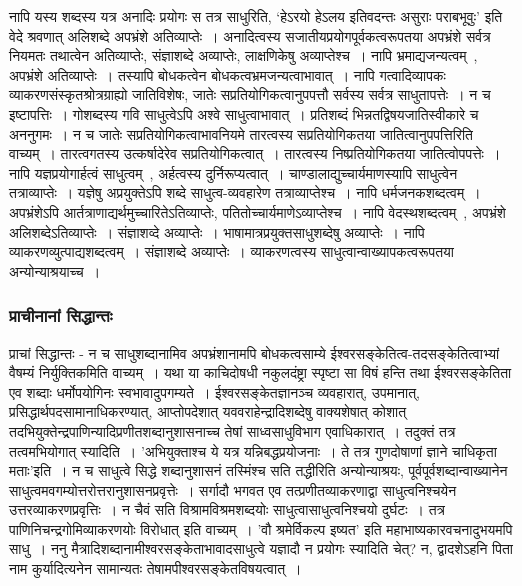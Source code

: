 				नापि यस्य शब्दस्य यत्र अनादिः प्रयोगः स तत्र साधुरिति, ‘हेऽरयो हेऽलय इतिवदन्तः असुराः पराबभूवुः’ इति वेदे श्रवणात्  अलिशब्दे अपभ्रंशे अतिव्याप्तेः~। अनादित्वस्य सजातीयप्रयोगपूर्वकत्वरूपतया अपभ्रंशे सर्वत्र नियमतः तथात्वेन अतिव्याप्तेः, संज्ञाशब्दे अव्याप्तेः, लाक्षणिकेषु अव्याप्तेश्च~। नापि भ्रमाद्यजन्यत्वम्~, अपभ्रंशे अतिव्याप्तेः~। तस्यापि बोधकत्वेन बोधकत्वभ्रमजन्यत्वाभावात्~। नापि गत्वादिव्यापकः व्याकरणसंस्कृतश्रोत्रग्राह्यो जातिविशेषः, जातेः सप्रतियोगिकत्वानुपपत्तौ सर्वस्य सर्वत्र साधुतापत्तेः~। न च इष्टापत्तिः~। गोशब्दस्य गवि साधुत्वेऽपि अश्वे साधुत्वाभावात्~। प्रतिशब्दं भिन्नतद्विषयजातिस्वीकारे च अननुगमः~। न च जातेः सप्रतियोगिकत्वाभावनियमे तारत्वस्य सप्रतियोगिकतया जातित्वानुपपत्तिरिति वाच्यम्~। तारत्वगतस्य उत्कर्षादेरेव सप्रतियोगिकत्वात्~। तारत्वस्य निष्प्रतियोगिकतया जातित्वोपपत्तेः~। नापि यज्ञप्रयोगार्हत्वं साधुत्वम्~, अर्हत्वस्य दुर्निरूप्यत्वात्~। चाण्डालाद्युच्चार्यमाणस्यापि साधुत्वेन तत्राव्याप्तेः~। यज्ञेषु अप्रयुक्तेऽपि शब्दे साधुत्व-व्यवहारेण तत्राव्याप्तेश्च~। नापि    धर्मजनकशब्दत्वम्~। अपभ्रंशेऽपि आर्तत्राणाद्यर्थमुच्चारितेऽतिव्याप्तेः, पतितोच्चार्यमाणेऽव्याप्तेश्च~। नापि वेदस्थशब्दत्वम्~, अपभ्रंशे अलिशब्देऽतिव्याप्तेः~। संज्ञाशव्दे अव्याप्तेः~। भाषामात्रप्रयुक्तसाधुशब्देषु अव्याप्तेः~। नापि व्याकरणव्युत्पाद्यशब्दत्वम्~। संज्ञाशब्दे अव्याप्तेः~। व्याकरणत्वस्य साधुत्वान्वाख्यापकत्वरूपतया अन्योन्याश्रयाच्च~।

	
			\subsubsection{प्राचीनानां सिद्धान्तः}
			
				प्राचां सिद्धान्तः - न च साधुशब्दानामिव अपभ्रंशानामपि बोधकत्वसाम्ये ईश्वरसङ्केतित्व-तदसङ्केतित्वाभ्यां वैषम्यं निर्युक्तिकमिति वाच्यम्~। यथा या काचिदोषधी नकुलदंष्ट्रा स्पृष्टा सा विषं हन्ति तथा ईश्वरसङ्केतिता एव शब्दाः धर्मोपयोगिनः स्वभावादुपगम्यते~। ईश्वरसङ्केतज्ञानञ्च व्यवहारात्, उपमानात्, प्रसिद्धार्थपदसामानाधिकरण्यात्, आप्तोपदेशात् यववराहेन्द्रादिशब्देषु वाक्यशेषात् कोशात् तदभियुक्तेन्द्रपाणिन्यादिप्रणीतशब्दानुशासनाच्च तेषां साध्वसाधुविभाग एवाधिकारात्~। तदुक्तं तत्र तत्वमभियोगात् स्यादिति~। ’अभियुक्ताश्च ये यत्र यन्निबद्धप्रयोजनाः~। ते तत्र गुणदोषाणां ज्ञाने चाधिकृता मताः’इति~। न च साधुत्वे सिद्धे शब्दानुशासनं तस्मिंश्च सति तद्धीरिति अन्योन्याश्रयः, पूर्वपूर्वशब्दान्वाख्यानेन साधुत्वमवगम्योत्तरोत्तरानुशासनप्रवृत्तेः~। सर्गादौ भगवत एव तत्प्रणीतव्याकरणाद्वा साधुत्वनिश्चयेन उत्तरव्याकरणप्रवृत्तिः~। न चैवं सति विश्रामविश्रमशब्दयोः साधुत्वासाधुत्वनिश्चयो दुर्घटः~। तत्र पाणिनिचन्द्रगोमिव्याकरणयोः विरोधात् इति वाच्यम्~। ’वौ श्रमेर्विकल्प इष्यत’ इति महाभाष्यकारवचनादुभयमपि साधु~। ननु मैत्रादिशब्दानामीश्वरसङ्केताभावादसाधुत्वे यज्ञादौ न प्रयोगः स्यादिति चेत्? न, द्वादशेऽहनि पिता नाम कुर्यादित्यनेन सामान्यतः तेषामपीश्वरसङ्केतविषयत्वात्~। 
	
